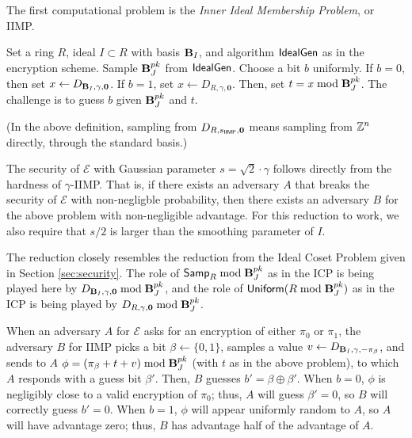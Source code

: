         The first computational problem is the \emph{Inner Ideal Membership Problem}, or IIMP.

        \begin{definition} 
            Set a ring $R$, ideal $I \subset R$ with basis $\textbf{B}_I$, and algorithm ${\sf IdealGen}$ as in the encryption scheme. Sample $\textbf{B}_J^{pk}$ from ${\sf IdealGen}$. Choose a bit $b$ uniformly. If $b = 0$, then set $x \leftarrow D_{\textbf{B}_I, \gamma, \mathbf{0}}$. If $b = 1$, set $x \leftarrow D_{R, \gamma, \mathbf{0}}$. Then, set $t = x \bmod \textbf{B}_J^{pk}$. The challenge is to guess $b$ given $\textbf{B}_J^{pk}$ and $t$.
        \end{definition}

        (In the above definition, sampling from $D_{R, s_{\sf IIMP}, \mathbf{0}}$ means sampling from $\mathbb{Z}^n$ directly, through the standard basis.)

        The security of $\mathcal{E}$ with Gaussian parameter $s = \sqrt{2} \cdot \gamma$ follows directly from the hardness of $\gamma$-IIMP. That is, if there exists an adversary $A$ that breaks the security of $\mathcal{E}$ with non-negligble probability, then there exists an adversary $B$ for the above problem with non-negligible advantage. For this reduction to work, we also require that $s / 2$ is larger than the smoothing parameter of $I$.

        The reduction closely resembles the reduction from the Ideal Coset Problem given in Section \ref{sec:security}. The role of ${\sf Samp}_R \bmod \textbf{B}_J^{pk}$ as in the ICP is being played here by $D_{\textbf{B}_I, \gamma, \mathbf{0}} \bmod \textbf{B}_J^{pk}$, and the role of ${\sf Uniform}(R \bmod \textbf{B}_J^{pk})$ as in the ICP is being played by $D_{R, \gamma, \mathbf{0}} \bmod \textbf{B}_J^{pk}$.

        When an adversary $A$ for $\mathcal{E}$ asks for an encryption of either $\pi_0$ or $\pi_1$, the adversary $B$ for IIMP picks a bit $\beta \leftarrow \{0,1\}$, samples a value $v \leftarrow D_{\textbf{B}_I, \gamma, - \pi_\beta}$, and sends to $A$ $\phi = (\pi_\beta + t + v) \bmod \textbf{B}_J^{pk}$ (with $t$ as in the above problem), to which $A$ responds with a guess bit $\beta'$. Then, $B$ guesses $b' = \beta \oplus \beta'.$ When $b = 0$, $\phi$ is negligibly close to a valid encryption of $\pi_0$; thus, $A$ will guess $\beta' = 0$, so $B$ will correctly guess $b' = 0$. When $b = 1$, $\phi$ will appear uniformly random to $A$, so $A$ will have advantage zero; thus, $B$ has advantage half of the advantage of $A$.

        \vspace{2em}

